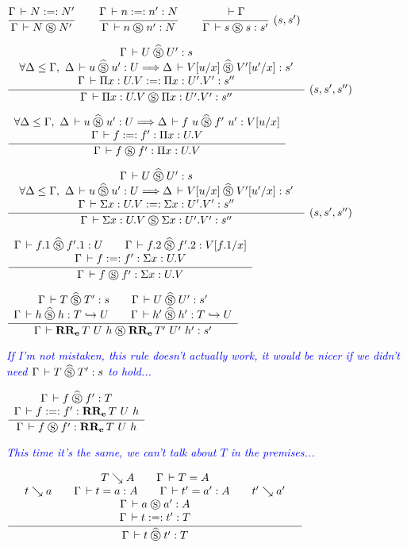 \documentclass[a4paper,english]{lipics-utf8x}
\newcommand\meta[1]{\noindent\textcolor{blue}{\emph{#1}}}
\begin{document}
  \begin{center}
  \(
    \ru{\Gamma \der N :=: N'
      }{\Gamma \der N \Sr N'}
    \qquad
    \ru{\Gamma \der n :=: n' : N
      }{\Gamma \der n \Sr n' : N}
    \qquad
    \rux{\der \Gamma
       }{\Gamma \der s \Sr s : s'
       }{(s,s')}
  \)
  \end{center}

  \begin{center}
  \(
    \trux{\Gamma \der U \hSr U' : s
        }{\forall \Delta \le \Gamma,\ \Delta \der u \hSr u' : U \gives
          \Delta \der V[u/x] \hSr V'[u'/x] : s'
        }{\Gamma \der \Pi x:U.V :=: \Pi x:U'.V' : s''
        }{\Gamma \der \Pi x:U.V \Sr \Pi x:U'.V' : s''
        }{(s,s',s'')}
  \)
  \end{center}

  \begin{center}
  \(
    \dru{\forall \Delta \le \Gamma,\ \Delta \der u \hSr u' : U \gives
         \Delta \der f~u \hSr f'~u' : V[u/x]
       }{\Gamma \der f :=: f' : \Pi x:U.V
       }{\Gamma \der f \Sr f' : \Pi x:U.V}
  \)
  \end{center}

  \begin{center}
  \(
    \trux{\Gamma \der U \hSr U' : s
        }{\forall \Delta \le \Gamma,\ \Delta \der u \hSr u' : U \gives
          \Delta \der V[u/x] \hSr V'[u'/x] : s'
        }{\Gamma \der \Sigma x:U.V :=: \Sigma x:U'.V' : s''
        }{\Gamma \der \Sigma x:U.V \Sr \Sigma x:U'.V' : s''
        }{(s,s',s'')}
  \)
  \end{center}

  \begin{center}
  \(
    \dru{\Gamma \der f.1 \hSr f'.1 : U \qquad
         \Gamma \der f.2 \hSr f'.2 : V[f.1/x]
       }{\Gamma \der f :=: f' : \Sigma x:U.V
       }{\Gamma \der f \Sr f' : \Sigma x:U.V}
  \)
  \end{center}

  \begin{center}
  \(
    \dru{\Gamma \der T \hSr T' : s \qquad
         \Gamma \der U \hSr U' : s'
       }{\Gamma \der h \hSr h : \emb{T}{U} \qquad
         \Gamma \der h' \hSr h' : \emb{T}{U}
       }{\Gamma \der \RRe{T}{U}{h} \Sr \RRe{T'}{U'}{h'} : s'}
  \)
  \end{center}

  \meta{If I'm not mistaken, this rule doesn't actually work, it would be nicer
  if we didn't need $\Gamma \,\vdash T \mathrel{\widehat{\mathrel{\circledS}}} T' : s$ to hold...}

  \begin{center}
  \(
    \dru{\Gamma \der f \hSr f' : T
       }{\Gamma \der f :=: f' : \RRe{T}{U}{h}
       }{\Gamma \der f \Sr f' : \RRe{T}{U}{h}}
  \)
  \end{center}

  \meta{This time it's the same, we can't talk about $T$ in the premises...}

  \begin{center}
  \(
    \qru{T \rew A \qquad
         \Gamma \der T = A
       }{t \rew a \qquad
         \Gamma \der t = a : A \qquad
         \Gamma \der t' = a' : A \qquad
         t' \rew a'
       }{\Gamma \der a \Sr a' : A
       }{\Gamma \der t :=: t' : T
       }{\Gamma \der t \hSr t' : T}
  \)
  \end{center}
\end{document}
